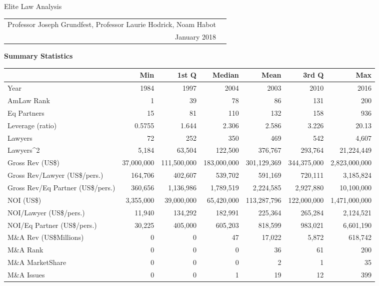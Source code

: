 \documentclass{article}
\begin{document}
\begin{center}{\LARGE Elite Law Analysis}
\\
\begin{tabular}{rl}\\Professor Joseph Grundfest, Professor Laurie Hodrick, Noam Habot \\January 2018\end{tabular}\end{center}{\large \textbf{Summary Statistics} }%
\begin{table}[H]
\centering
\begin{tabular}{lrrrrrr}
  \hline
 & Min & 1st Q & Median & Mean & 3rd Q & Max \\ 
  \hline
Year & 1984 & 1997 & 2004 & 2003 & 2010 & 2016 \\ 
  AmLaw Rank & 1 & 39 & 78 & 86 & 131 & 200 \\ 
  Eq Partners & 15 & 81 & 110 & 132 & 158 & 936 \\ 
  Leverage (ratio) & 0.5755 & 1.644 & 2.306 & 2.586 & 3.226 & 20.13 \\ 
  Lawyers & 72 & 252 & 350 & 469 & 542 & 4,607 \\ 
  Lawyers^2 & 5,184 & 63,504 & 122,500 & 376,767 & 293,764 & 21,224,449 \\ 
  Gross Rev (US\$) & 37,000,000 & 111,500,000 & 183,000,000 & 301,129,369 & 344,375,000 & 2,823,000,000 \\ 
  Gross Rev/Lawyer (US\$/pers.) & 164,706 & 402,607 & 539,702 & 591,169 & 720,111 & 3,185,824 \\ 
  Gross Rev/Eq Partner (US\$/pers.) & 360,656 & 1,136,986 & 1,789,519 & 2,224,585 & 2,927,880 & 10,100,000 \\ 
  NOI (US\$) & 3,355,000 & 39,000,000 & 65,420,000 & 113,287,796 & 122,000,000 & 1,471,000,000 \\ 
  NOI/Lawyer (US\$/pers.) & 11,940 & 134,292 & 182,991 & 225,364 & 265,284 & 2,124,521 \\ 
  NOI/Eq Partner (US\$/pers.) & 30,225 & 405,000 & 605,203 & 818,599 & 983,021 & 6,601,190 \\ 
  M\&A Rev (US\$Millions) & 0 & 0 & 47 & 17,022 & 5,872 & 618,742 \\ 
  M\&A  Rank & 0 & 0 & 0 & 36 & 61 & 200 \\ 
  M\&A MarketShare & 0 & 0 & 0 & 2 & 1 & 35 \\ 
  M\&A Issues & 0 & 0 & 1 & 19 & 12 & 399 \\ 

\end{tabular}
\end{table}
\end{document}
